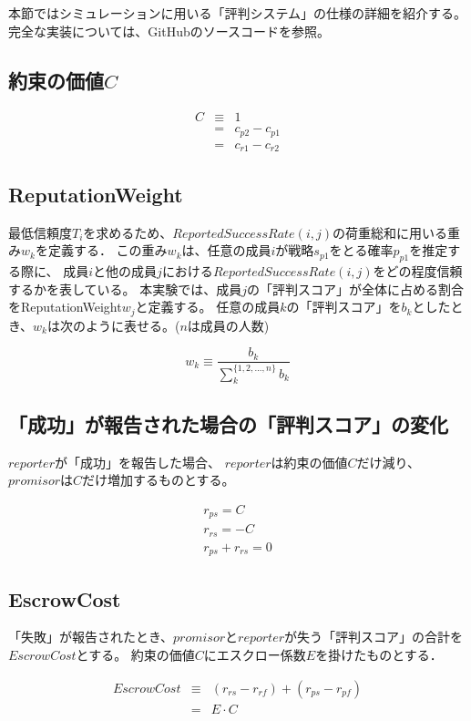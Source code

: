 本節ではシミュレーションに用いる「評判システム」の仕様の詳細を紹介する。
完全な実装については、GitHubのソースコードを参照。

\subsection{約束の価値$C$}
\begin{eqnarray}
  C &\equiv& 1 \\
    &=& c_{p2} - c_{p1} \\
    &=& c_{r1} - c_{r2}
\end{eqnarray}

\subsection{ReputationWeight}
最低信頼度$ T_i $を求めるため、$ReportedSuccessRate(i, j)$の荷重総和に用いる重み$ w_k $を定義する．
この重み$w_k$は、任意の成員$i$が戦略$s_{p1}$をとる確率$p_{p1}$を推定する際に、
成員$i$と他の成員$j$における$ReportedSuccessRate(i, j)$をどの程度信頼するかを表している。
本実験では、成員$j$の「評判スコア」が全体に占める割合をReputationWeight$w_j$と定義する。
任意の成員$k$の「評判スコア」を$b_k$としたとき、$w_k$は次のように表せる。($n$は成員の人数)

\begin{equation*}
  w_k \equiv \frac{b_k}{\sum^{\{1,2,...,n\}}_{k}b_k}
\end{equation*}

\subsection{「成功」が報告された場合の「評判スコア」の変化}
$ reporter $が「成功」を報告した場合、
$ reporter $は約束の価値$C$だけ減り、$ promisor $は$C$だけ増加するものとする。

\begin{gather}
  r_{ps} = C \\
  r_{rs} = -C \\
  r_{ps} + r_{rs} = 0
\end{gather}


\subsection{EscrowCost}
「失敗」が報告されたとき、$promisor$と$reporter$が失う「評判スコア」の合計を$EscrowCost$とする。
約束の価値$C$にエスクロー係数$E$を掛けたものとする．

\begin{eqnarray}
  EscrowCost  &\equiv& (r_{rs} - r_{rf}) + (r_{ps} - r_{pf}) \\
              &=& E \cdot C
\end{eqnarray}

